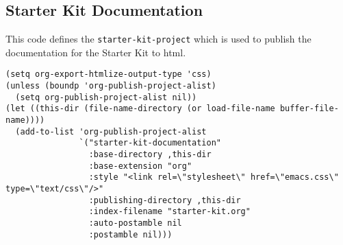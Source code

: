 \documentclass[11pt]{article}
\begin{document}
\subsection*{Starter Kit Documentation}
\label{sec-1_9}

This code defines the \texttt{starter-kit-project} which is used to publish
the documentation for the Starter Kit to html.

\begin{verbatim}
(setq org-export-htmlize-output-type 'css)
(unless (boundp 'org-publish-project-alist)
  (setq org-publish-project-alist nil))
(let ((this-dir (file-name-directory (or load-file-name buffer-file-name))))
  (add-to-list 'org-publish-project-alist
               `("starter-kit-documentation"
                 :base-directory ,this-dir
                 :base-extension "org"
                 :style "<link rel=\"stylesheet\" href=\"emacs.css\" type=\"text/css\"/>"
                 :publishing-directory ,this-dir
                 :index-filename "starter-kit.org"
                 :auto-postamble nil
                 :postamble nil)))
\end{verbatim}
\end{document}
